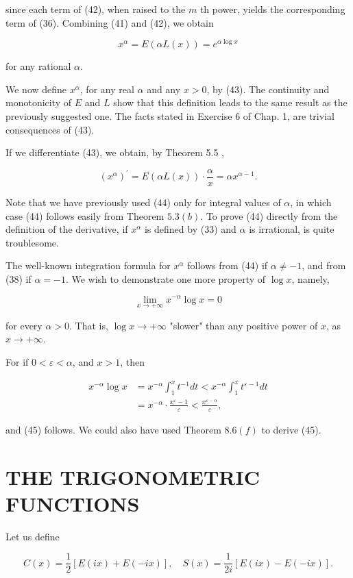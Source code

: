 \documentclass[10pt]{article}
\begin{document}
since each term of (42), when raised to the $m$ th power, yields the corresponding term of (36). Combining (41) and (42), we obtain

$$
x^{\alpha}=E(\alpha L(x))=e^{\alpha \log x}
$$

for any rational $\alpha$.

We now define $x^{\alpha}$, for any real $\alpha$ and any $x>0$, by (43). The continuity and monotonicity of $E$ and $L$ show that this definition leads to the same result as the previously suggested one. The facts stated in Exercise 6 of Chap. 1, are trivial consequences of (43).

If we differentiate (43), we obtain, by Theorem 5.5 ,

$$
\left(x^{\alpha}\right)^{\prime}=E(\alpha L(x)) \cdot \frac{\alpha}{x}=\alpha x^{\alpha-1} .
$$

Note that we have previously used (44) only for integral values of $\alpha$, in which case (44) follows easily from Theorem $5.3(b)$. To prove (44) directly from the definition of the derivative, if $x^{\alpha}$ is defined by (33) and $\alpha$ is irrational, is quite troublesome.

The well-known integration formula for $x^{\alpha}$ follows from (44) if $\alpha \neq-1$, and from (38) if $\alpha=-1$. We wish to demonstrate one more property of $\log x$, namely,

$$
\lim _{x \rightarrow+\infty} x^{-\alpha} \log x=0
$$

for every $\alpha>0$. That is, $\log x \rightarrow+\infty$ "slower" than any positive power of $x$, as $x \rightarrow+\infty$.

For if $0<\varepsilon<\alpha$, and $x>1$, then

$$
\begin{aligned}
x^{-\alpha} \log x & =x^{-\alpha} \int_{1}^{x} t^{-1} d t<x^{-\alpha} \int_{1}^{x} t^{\varepsilon-1} d t \\
& =x^{-\alpha} \cdot \frac{x^{\varepsilon}-1}{\varepsilon}<\frac{x^{\varepsilon-\alpha}}{\varepsilon},
\end{aligned}
$$

and (45) follows. We could also have used Theorem $8.6(f)$ to derive (45).

\section{THE TRIGONOMETRIC FUNCTIONS}
Let us define

$$
C(x)=\frac{1}{2}[E(i x)+E(-i x)], \quad S(x)=\frac{1}{2 i}[E(i x)-E(-i x)] .
$$
\end{document}
